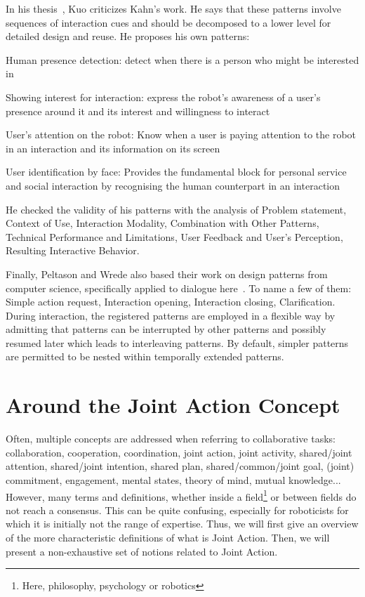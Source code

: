 \documentclass[a4paper,11pt,twoside]{StyleThese}
\begin{document}
In his thesis~\cite{kuo_2012_designing}, Kuo criticizes Kahn’s work. He says that these patterns involve sequences of interaction cues and should be decomposed to a lower level for detailed design and reuse. He proposes his own patterns:
\begin{enumerate*}
	\item Human presence detection: detect when there is a person who might be interested in
	\item Showing interest for interaction: express the robot’s awareness of a user’s presence around it and its interest and willingness to interact
	\item User’s attention on the robot: Know when a user is paying attention to the robot in an interaction and its information on its screen
	\item User identification by face: Provides the fundamental block for personal service and social interaction by recognising the human counterpart in an interaction
\end{enumerate*}
He checked the validity of his patterns with the analysis of Problem statement, Context of Use, Interaction Modality, Combination with Other Patterns, Technical Performance and Limitations, User Feedback and User’s Perception, Resulting Interactive Behavior.

Finally, Peltason and Wrede also based their work on design patterns from computer science, specifically applied to dialogue here~\cite{peltason_2010_pamini}. To name a few of them: Simple action request, Interaction opening, Interaction closing, Clarification. During interaction, the registered patterns are employed in a flexible way by admitting that patterns can be interrupted by other patterns and possibly resumed later which leads to interleaving patterns. By default, simpler patterns are permitted to be nested within temporally extended patterns.

\section{Around the Joint Action Concept}
Often, multiple concepts are addressed when referring to collaborative tasks: collaboration, cooperation, coordination, joint action, joint activity, shared/joint attention, shared/joint intention, shared plan, shared/common/joint goal, (joint) commitment, engagement, mental states, theory of mind, mutual knowledge... However, many terms and definitions, whether inside a field\footnote{Here, philosophy, psychology or robotics} or between fields do not reach a consensus. This can be quite confusing, especially for roboticists for which it is initially not the range of expertise. Thus, we will first give an overview of the more characteristic definitions of what is Joint Action. Then, we will present a non-exhaustive set of notions related to Joint Action. 
\end{document}
